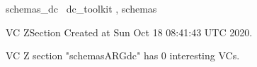 \documentclass{article}
\begin{document}

\begin{zsection}	 \SECTION schemas\_dc \parents~dc\_toolkit , schemas
\end{zsection}

\newcommand{\appliesTo}{\zbinop{appliesTo}} 
\newcommand{\appliesToNofix}{\zpreop{appliesToNofix}} 

VC ZSection Created at Sun Oct 18 08:41:43 UTC 2020.



 VC Z section "schemasARGdc" has $0$ interesting VCs.



\end{document}
